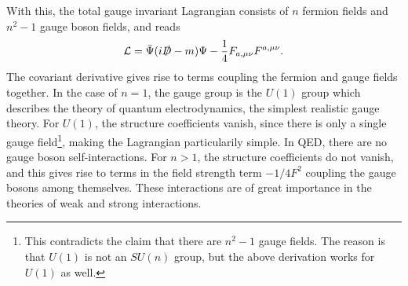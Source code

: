 \documentclass[twoside,english]{uiofysmaster}
\begin{document}
With this, the total gauge invariant Lagrangian consists of $n$ fermion fields and $n^2-1$ gauge boson fields, and reads
\begin{align}
	\mathcal{L} = \bar\Psi(i\slashed D - m)\Psi - \frac{1}{4} F_{a,\mu\nu} F^{a,\mu\nu}.
\end{align}
The covariant derivative gives rise to terms coupling the fermion and gauge fields together. In the case of $n=1$, the gauge group is the $U(1)$ group which describes the theory of quantum electrodynamics, the simplest realistic gauge theory. For $U(1)$, the structure coefficients vanish, since there is only a single gauge field\footnote{This contradicts the claim that there are $n^2-1$ gauge fields. The reason is that $U(1)$ is not an $SU(n)$ group, but the above derivation works for $U(1)$ as well.}, making the Lagrangian particularily simple. In QED, there are no gauge boson self-interactions. For $n>1$, the structure coefficients do not vanish, and this gives rise to terms in the field strength term $-1/4 F^2$ coupling the gauge bosons among themselves. These interactions are of great importance in the theories of weak and strong interactions.
\end{document}
